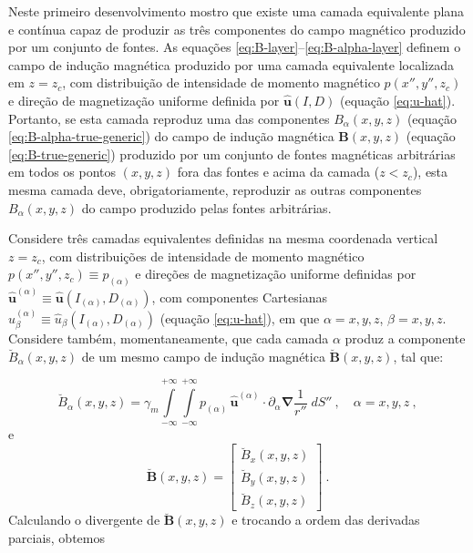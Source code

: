 Neste primeiro desenvolvimento mostro que existe uma camada equivalente plana e contínua capaz de produzir as três componentes do campo magnético produzido por um conjunto de fontes. As equações \ref{eq:B-layer}--\ref{eq:B-alpha-layer} definem o campo de indução magnética produzido por uma camada equivalente localizada em $z = z_{c}$, com distribuição de intensidade de momento magnético $p(x'', y'', z_{c})$ e direção de magnetização uniforme definida por $\hat{\mathbf{u}}(I, D)$ (equação \ref{eq:u-hat}). Portanto, se esta camada reproduz uma das componentes $B_{\alpha}(x, y, z)$ (equação \ref{eq:B-alpha-true-generic}) do campo de indução magnética $\mathbf{B}(x, y, z)$ (equação \ref{eq:B-true-generic}) produzido por um conjunto de fontes magnéticas arbitrárias em todos os pontos $(x, y, z)$ fora das fontes e acima da camada ($z < z_{c}$), esta mesma camada deve, obrigatoriamente, reproduzir as outras componentes $B_{\alpha}(x, y, z)$ do campo produzido pelas fontes arbitrárias.

Considere três camadas equivalentes definidas na mesma coordenada vertical $z = z_{c}$, 
com distribuições de intensidade de momento magnético $p(x'', y'', z_{c}) \equiv p_{(\alpha)}$ e direções de magnetização uniforme definidas por $\hat{\mathbf{u}}^{(\alpha)} \equiv \hat{\mathbf{u}}(I_{(\alpha)}, D_{(\alpha)})$, com componentes Cartesianas $\hat{u}^{(\alpha)}_{\beta} \equiv \hat{u}_{\beta}(I_{(\alpha)}, D_{(\alpha)})$ (equação \ref{eq:u-hat}), em que $\alpha = x, y, z$, $\beta = x, y, z$. 
Considere também, momentaneamente, que cada camada $\alpha$ produz a componente 
$\breve{B}_{\alpha}(x, y, z)$ de um mesmo campo de indução magnética $\breve{\mathbf{B}}(x, y, z)$, tal que:

\begin{equation}
\breve{B}_{\alpha}(x, y, z) = \gamma_{m} \int\limits_{-\infty}^{+\infty}\int\limits_{-\infty}^{+\infty} 
p_{(\alpha)} \, \hat{\mathbf{u}}^{(\alpha)} \cdot \partial_{\alpha} \boldsymbol{\nabla} \frac{1}{r''} \; dS'' 
\: , \quad \alpha = x, y, z \: ,
\label{eq:B-alpha-3layers}
\end{equation}
e
\begin{equation}
\breve{\mathbf{B}}(x, y, z) = \begin{bmatrix}
\breve{B}_{x}(x, y, z) \\
\breve{B}_{y}(x, y, z) \\
\breve{B}_{z}(x, y, z)
\end{bmatrix} \: .
\label{eq:B-3layers}
\end{equation}
Calculando o divergente de $\breve{\mathbf{B}}(x, y, z)$ e trocando a ordem das derivadas parciais, obtemos 

